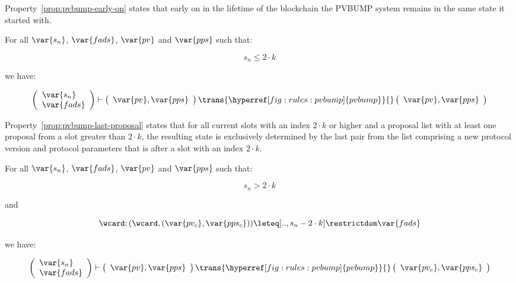 Property~\ref{prop:pvbump-early-on} states that early on in the lifetime
of the blockchain the PVBUMP system remains in the same state it started with.

\begin{property}\label{prop:pvbump-early-on}
  \textnormal{For all $\var{s_n}$, $\var{fads}$, $\var{pv}$ and $\var{pps}$
    such that:}

  $$s_n \leq 2 \cdot k$$

  \textnormal{we have:}

  $$
  \left(
    \begin{array}{l}
      \var{s_n}\\
      \var{fads}
    \end{array}
  \right)
  \vdash
  \left(
    \begin{array}{l}
      \var{pv}, \var{pps}\\
    \end{array}
  \right)
  \trans{\hyperref[fig:rules:pvbump]{pvbump}}{}
  \left(
    \begin{array}{l}
      \var{pv}, \var{pps}\\
    \end{array}
  \right)
  $$
\end{property}

Property~\ref{prop:pvbump-last-proposal} states that for all current slots
with an index $2 \cdot k$ or higher and a proposal list with at least one
proposal from a slot greater than $2 \cdot k$, the resulting state is
exclusively determined by the last pair from the list comprising a new
protocol version and protocol parameters that is after a slot with an index
$2 \cdot k$.

\begin{property}\label{prop:pvbump-last-proposal}
  \textnormal{For all $\var{s_n}$, $\var{fads}$, $\var{pv}$ and $\var{pps}$
    such that:}

  $$s_n > 2 \cdot k$$

  \textnormal{and}

  $$
  \wcard ; (\wcard , (\var{pv_c}, \var{pps_c})) \leteq [.., s_n - 2 \cdot k]
  \restrictdom \var{fads}
  $$

  \textnormal{we have:}

  $$
  \left(
    \begin{array}{l}
      \var{s_n}\\
      \var{fads}
    \end{array}
  \right)
  \vdash
  \left(
    \begin{array}{l}
      \var{pv}, \var{pps}\\
    \end{array}
  \right)
  \trans{\hyperref[fig:rules:pvbump]{pvbump}}{}
  \left(
    \begin{array}{l}
      \var{pv_c}, \var{pps_c}\\
    \end{array}
  \right)
  $$
\end{property}


